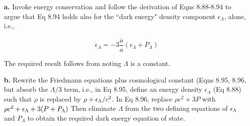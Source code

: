 \documentclass[12pt]{article}
\begin{document}
\textbf{a.} Invoke energy conservation and follow the derivation of Eqns 8.88-8.94 to argue that Eq 8.94 holds  also for the ``dark energy" density component \(\epsilon_\Lambda\), alone, i.e.,

\[\dot{\epsilon}_\Lambda = -3\frac{\dot{a}}{a}(\epsilon_\Lambda + P_\Lambda)
\]

The required result follows from noting \(\Lambda\) is a constant. \newline

\textbf{b.} Rewrite the Friedmann equations plus cosmological constant (Eqns 8.95, 8.96, but absorb the \(\Lambda/3\) term, i.e., in Eq 8.95, define an energy density \(\epsilon_\Lambda\) (Eq 8.88) such that \(\rho\) is replaced by \(\rho + \epsilon_\Lambda/c^2\). In Eq 8.96, replace  \(\rho c^2 + 3P\) with \(\rho c^2 + \epsilon_\Lambda + 3(P+P_\Lambda) \) Then eliminate \(\Lambda\) from the two defining equations of \(\epsilon_\Lambda\) and \(P_\Lambda\) to obtain the required dark energy equation of state.
\end{document}

